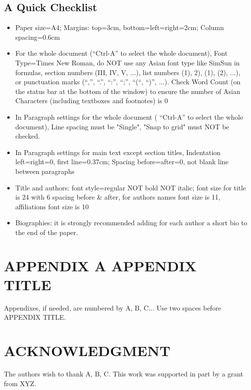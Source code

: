 \documentclass{ijisa}
\begin{document}
\subsection{A Quick Checklist} 
\begin{itemize}
	\item Paper size=A4; Margins: top=3cm, bottom=left=right=2cm; Column spacing=0.6cm
	\item For the whole document (“Ctrl-A” to select the whole document), Font Type=Times New Roman, do NOT use any Asian font type like SimSun in formulas, section numbers (III, IV, V, ...), list numbers (1), 2), (1), (2), ...), or punctuation marks (“,”, “.”, “:”, “;”, “(“, “)”, ...). Check Word Count (on the status bar at the bottom of the window) to ensure the number of Asian Characters (including textboxes and footnotes) is 0
	\item 	In Paragraph settings for the whole document ( “Ctrl-A” to select the whole document), Line spacing must be "Single", "Snap to grid" must NOT be checked. 
	\item In Paragraph settings for main text except section titles, Indentation left=right=0, first line=0.37cm; Spacing before=after=0, not blank line between paragraphs
	
	\item Title and authors: font style=regular NOT bold NOT italic; font size for title is 24 with 6 spacing before \& after, for authors names font size is 11, affiliations font size is 10
	
	\item Biographies: it is strongly recommended adding for each author a short bio to the end of the paper.
	
\end{itemize}


\section{APPENDIX A APPENDIX TITLE}
Appendixes, if needed, are numbered by A, B, C... Use two spaces before APPENDIX TITLE.


\section{ACKNOWLEDGMENT}
	The authors wish to thank A, B, C. This work was supported in part by a grant from XYZ.	



\end{document}
